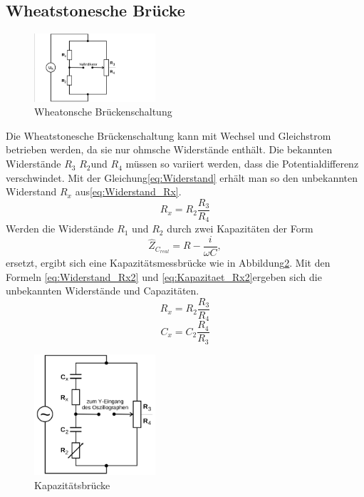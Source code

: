 \subsection{Wheatstonesche Brücke}
\begin{figure}
  \centering
  \includegraphics[width=0.4\textwidth]{Bilder/Wheatonsche.png}
  \caption{Wheatonsche Brückenschaltung}
  \label{fig:wheatonsche}
\end{figure}
Die Wheatstonesche Brückenschaltung kann mit Wechsel und Gleichstrom betrieben werden,
da sie nur ohmsche Widerstände enthält. Die bekannten Widerstände $R_3$ $R_2$und $R_4$
 müssen so variiert werden, dass die Potentialdifferenz verschwindet. Mit der
Gleichung\eqref{eq:Widerstand} erhält man so den unbekannten Widerstand $R_x$
aus\eqref{eq:Widerstand_Rx}.
\begin{equation}
R_x=R_2 \frac{R_3}{R_4}
\label{eq:Widerstand_Rx1}
\end{equation}
Werden die Widerstände $R_1$ und $R_2$ durch zwei Kapazitäten der Form
\begin{equation}
\hat{Z}_{C_{real}}=R-\frac{i}{\omega C}  ,
\end{equation}
ersetzt, ergibt sich eine Kapazitätsmessbrücke  wie in Abbildung\ref{fig:capbruecke}.
Mit den Formeln \eqref{eq:Widerstand_Rx2} und \eqref{eq:Kapazitaet_Rx2}ergeben
sich die unbekannten Widerstände und Capazitäten.
\begin{equation}
R_x=R_2\frac{R_3}{R_4}
\label{eq:Widerstand_Rx2}
\end{equation}
\begin{equation}
C_x=C_2\frac{R_4}{R_3}
\label{eq:Kapazitaet_Rx2}
\end{equation}
\begin{figure}
  \centering
  \includegraphics[width=0.4\textwidth]{Bilder/Capazitaetsbruecke.png}
  \caption{Kapazitätsbrücke}
  \label{fig:capbruecke}
\end{figure}
